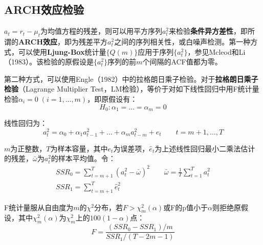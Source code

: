 \documentclass[11pt]{article}
\begin{document}
\subsection{ARCH效应检验}

$a_t = r_t - \mu_t$为均值方程的残差，则可以用平方序列$a_t^2$来检验\textbf{条件异方差性}，即所谓的\textbf{ARCH效应}，即为残差平方$a_t^2$之间的序列相关性，或白噪声检测。第一种方式，可以使用\textbf{Ljung-Box}统计量$\{Q(m)\}$应用于序列$\{a_t^2\}$，参见Mcleod和Li（1983）。该检验的原假设是$\{a_t^2\}$序列的前$m$个间隔的ACF值都为零。

第二种方式，可以使用Engle（1982）中的拉格朗日乘子检验。对于\textbf{拉格朗日乘子检验}（Lagrange Multiplier Test，LM检验），等价于对如下线性回归中用F统计量检验$\alpha_i=0\;(i=1,\dots,m)$，即原假设有：
\begin{equation*}
    H_0: \alpha_1 = \dots = \alpha_m = 0
\end{equation*}

线性回归为：
\begin{equation*}
    a^2_t = \alpha_0 + \alpha_1 a^{2}_{t-1} + \dots + \alpha_m a^{2}_{t-m} + e_t \qquad t=m+1,\dots,T
\end{equation*}

$m$为正整数，$T$为样本容量，其中$e_t$为误差项，$\hat{e}_t$为上述线性回归最小二乘法估计的残差，$\bar{\omega}$为$a_t^2$的样本平均值。令：
\begin{gather*}
    SSR_0 = \sum_{t=m+1}^{T} (a_t^2 - \bar{\omega})^2 \qquad
    \bar{\omega} = \frac{1}{T} \sum_{t=1}^{T} a_t^2 \\
    SSR_1 = \sum_{t=m+1}^{T} \hat{e}_t^2
\end{gather*}

F统计量服从自由度为$m$的$\chi^2$分布，若$F>\chi_m^2(\alpha)$或F的p值小于$\alpha$则拒绝原假设，其中$\chi_m^2(\alpha)$为$\chi_m^2$上的$100(1-\alpha)$点：
\begin{equation*}
    F = \frac{(SSR_0-SSR_1)/m}{SSR_1/(T-2m-1)}
\end{equation*}
\end{document}
